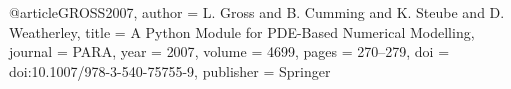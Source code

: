 \begin{shellCode}
@article{GROSS2007,
	author = {L. Gross and B. Cumming and K. Steube and D. Weatherley},
	title = {A Python Module for PDE-Based Numerical Modelling},
	journal = {PARA},
	year = {2007},
	volume = {4699},
	pages = {270--279},
	doi = {doi:10.1007/978-3-540-75755-9},
	publisher = {Springer}
}
\end{shellCode}

